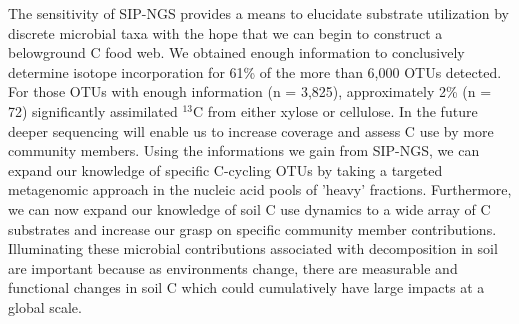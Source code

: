 The sensitivity of SIP-NGS provides a means to elucidate substrate utilization by discrete microbial taxa with the hope that we can begin to construct a belowground C food web. We obtained enough information to conclusively determine isotope incorporation for 61\% of the more than 6,000 OTUs detected. For those OTUs with enough information (n = 3,825), approximately 2\% (n = 72) significantly assimilated $^{13}$C from either xylose or cellulose. In the future deeper sequencing will enable us to increase coverage and assess C use by more community members. Using the informations we gain from SIP-NGS, we can expand our knowledge of specific C-cycling OTUs by taking a targeted metagenomic approach in the nucleic acid pools of 'heavy' fractions. Furthermore, we can now expand our knowledge of soil C use dynamics to a wide array of C substrates and increase our grasp on specific community member contributions. Illuminating these microbial contributions associated with decomposition in soil are important because as environments change, there are measurable and functional changes in soil C \citep{Grandy_2008} which could cumulatively have large impacts at a global scale.

